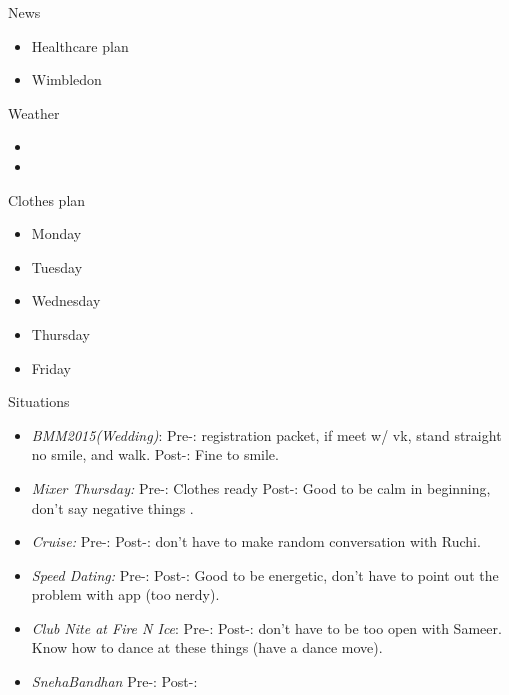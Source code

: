 \documentclass[serif, mathserif, final]{beamer}
\begin{document}
\begin{frame}{}
\begin{columns}
    \begin{column}{0.20\linewidth}
      \begin{block}{News}
        \begin{itemize}   
          \tiny \item \tiny Healthcare plan 
        \item \tiny Wimbledon 
        \end{itemize}
      \end{block}
      \begin{block}{Weather} 
        \begin{itemize}
          \tiny \item \tiny 
        \item \tiny 
        \end{itemize}
      \end{block} 
      \begin{block}{Clothes plan} 
        \begin{itemize} 
          \tiny \item \tiny Monday
        \item \tiny Tuesday
        \item \tiny Wednesday
        \item \tiny Thursday
        \item \tiny Friday
        \end{itemize} 
      \end{block}

      \begin{block}{Situations}
        \begin{itemize}
          
        \item \tiny \textit{BMM2015(Wedding)}: Pre-: registration
          packet, if meet w/ vk, stand straight no smile, and walk. 
          Post-: Fine to smile. 

        \item \tiny \textit{Mixer Thursday:} Pre-: Clothes ready
          Post-: Good to be calm in beginning, don't say negative
          things .  
        \item \tiny \textit{Cruise:} Pre-:  Post-: don't have to make
          random conversation with Ruchi.  
        \item \tiny \textit{Speed Dating:} Pre-:  Post-:  Good to be
          energetic, don't have to point out the problem with app
          (too nerdy).
        \item \tiny \textit{Club Nite at Fire N Ice}: Pre-:  Post-:
          don't have to be too open with Sameer. Know how to dance at
          these things (have a dance move). 
        \item \tiny \textit{SnehaBandhan} Pre-: Post-:  


\end{itemize}
\end{block}
\end{column}
\end{columns}
\end{frame}
\end{document}
